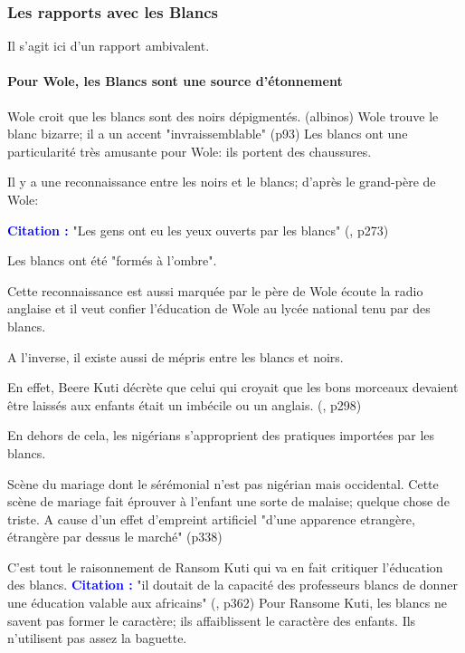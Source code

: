 \documentclass[a4paper, 11pt, hidelinks]{article}
\newcommand{\bs}{\bigskip}
\newcommand{\cit}{\large \textcolor{blue}{\textbf{Citation :}} \large }
\newcommand{\rb}[1]{\Romanbar{#1}}
\begin{document}
\subsubsection{Les rapports avec les Blancs}

Il s'agit ici d'un rapport ambivalent.

\paragraph{Pour Wole, les Blancs sont une source d'étonnement}


Wole croit que les blancs sont des noirs dépigmentés. (albinos)
Wole trouve le blanc bizarre; il a un accent "invraissemblable" (p93)
Les blancs ont une particularité très amusante pour Wole: ils portent des chaussures.

\bs

Il y a une reconnaissance entre les noirs et le blancs; d'après le grand-père de Wole:


\cit "Les gens ont eu les yeux ouverts par les blancs" (\rb{9}, p273)

Les blancs ont été "formés à l'ombre".

Cette reconnaissance est aussi marquée par le père de Wole écoute la radio anglaise et il
veut confier l'éducation de Wole au lycée national tenu par des blancs.
\bs


A l'inverse, il existe aussi de mépris entre les blancs et noirs.


En effet, Beere Kuti décrète que celui qui croyait que les bons morceaux devaient être laissés aux enfants
était un imbécile ou un anglais. (\rb{10}, p298)

\bs

En dehors de cela, les nigérians s'approprient des pratiques importées par les blancs.


Scène du mariage dont le sérémonial n'est pas nigérian mais occidental. Cette scène de mariage fait éprouver
à l'enfant une sorte de malaise; quelque chose de triste. A cause d'un effet d'empreint artificiel "d'une apparence
etrangère, étrangère par dessus le marché" (p338)



C'est tout le raisonnement de  Ransom Kuti qui va en fait critiquer l'éducation des blancs.
\cit "il doutait de la capacité des professeurs blancs de donner une éducation valable aux africains"
(\rb{73}, p362)
Pour Ransome Kuti, les blancs ne savent pas former le caractère; ils affaiblissent le caractère des enfants.
Ils n'utilisent pas assez la baguette.
\end{document}
